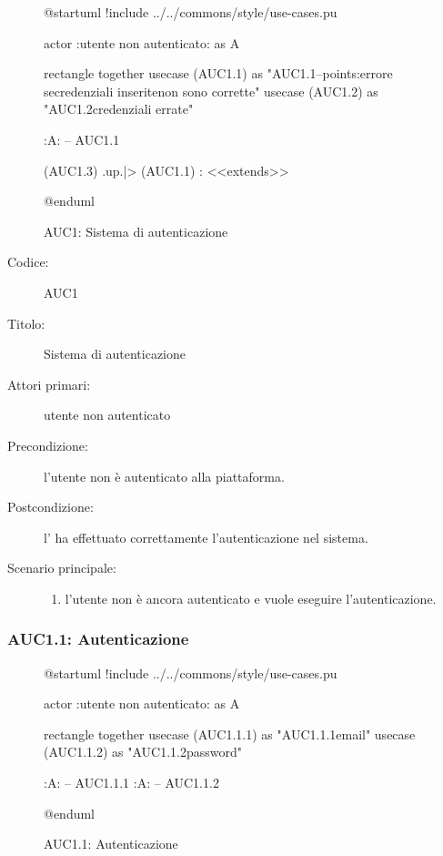 \documentclass[../../../analisi-dei-requisiti.tex]{subfiles}
\begin{document}
\begin{figure}[H]
  \centering
  \begin{plantuml}
  @startuml
  !include ../../commons/style/use-cases.pu

  actor :utente non autenticato: as A

  rectangle {
    together {
      usecase (AUC1.1) as "AUC1.1\nAutenticazione\n--\nExtension points:\nVisualizzazione errore se\nle credenziali inserite\n non sono corrette"
      usecase (AUC1.2) as "AUC1.2\nVisualizzazione credenziali errate"
    }
  }

  :A: -- AUC1.1

  (AUC1.3) .up.|> (AUC1.1) : <<extends>>

  @enduml
  \end{plantuml}
  \caption{AUC1: Sistema di autenticazione}
  \label{fig:auc1}
\end{figure}

\begin{description}
  \item[Codice:] AUC1
  \item[Titolo:] Sistema di autenticazione
  \item[Attori primari:] utente non autenticato
  \item[Precondizione:] l'utente non è autenticato alla piattaforma.
  \item[Postcondizione:] l' ha effettuato correttamente l'autenticazione nel sistema.
  \item[Scenario principale:]
  \begin{enumerate}
    \item l'utente non è ancora autenticato e vuole eseguire l'autenticazione.
  \end{enumerate}
\end{description}

\subsubsection{AUC1.1: Autenticazione}%
\label{subs:AUC1.1}

\begin{figure}[H]
  \centering
  \begin{plantuml}
  @startuml
  !include ../../commons/style/use-cases.pu

  actor :utente non autenticato: as A

  rectangle {
    together {
    usecase (AUC1.1.1) as "AUC1.1.1\nInserimento email"
    usecase (AUC1.1.2) as "AUC1.1.2\nInserimento password"
    }
  }

  :A: -- AUC1.1.1
  :A: -- AUC1.1.2

  @enduml
  \end{plantuml}
  \caption{AUC1.1: Autenticazione}
  \label{fig:auc1_1}
\end{figure}
\end{document}
